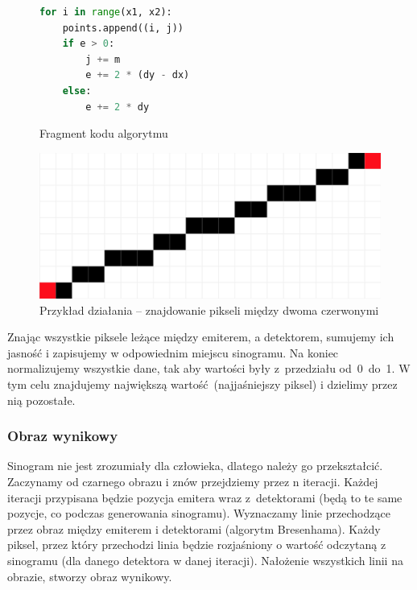 \documentclass[polish,polish,a4paper]{article}
\begin{document}
				\begin{figure}[!h]
					\centering
					\begin{minipage}{0.4\linewidth}
						\begin{lstlisting}[language=Python, frame=single]
for i in range(x1, x2):
    points.append((i, j))
    if e > 0:
        j += m
        e += 2 * (dy - dx)
    else:
        e += 2 * dy
						\end{lstlisting}
						\caption{Fragment kodu algorytmu}
					\end{minipage}
					\hfill
					\begin{minipage}{0.45\linewidth}
						\includegraphics[width=\textwidth]{img/bresenham.png}
						\caption{Przykład działania -- znajdowanie pikseli między dwoma czerwonymi}
					\end{minipage}
				\end{figure}
				
				Znając wszystkie piksele leżące między emiterem, a detektorem, 
				sumujemy ich jasność i zapisujemy w odpowiednim miejscu sinogramu.
				Na koniec normalizujemy wszystkie dane, tak aby wartości były z~przedziału od~0~do~1. W tym celu znajdujemy największą wartość (najjaśniejszy piksel) i dzielimy przez nią pozostałe.
				
				\subsubsection{Obraz wynikowy}
					Sinogram nie jest zrozumiały dla człowieka, 
					dlatego należy go przekształcić.
					Zaczynamy od czarnego obrazu i znów przejdziemy przez n iteracji.
					Każdej iteracji przypisana będzie pozycja emitera wraz z~detektorami 
					(będą to te same pozycje, co podczas generowania sinogramu).
					Wyznaczamy linie przechodzące przez obraz między emiterem i detektorami (algorytm Bresenhama).
					Każdy piksel, przez który przechodzi linia będzie rozjaśniony o wartość odczytaną z sinogramu 
					(dla danego detektora w danej iteracji). 
					Nałożenie wszystkich linii na obrazie, stworzy obraz wynikowy.
				
\end{document}
